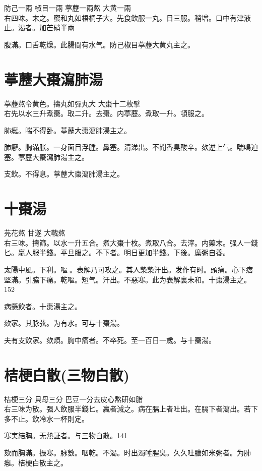 防己{\scriptsize 一兩} 椒目{\scriptsize 一兩} 葶藶{\scriptsize 一兩熬} 大黄{\scriptsize 一兩}\\
右四味。末之。蜜和丸如梧桐子大。先食飲服一丸。日三服。稍增。口中有津液止。渴者。加芒硝半兩

腹滿。口舌乾燥。此腸間有水气。防己椒目葶藶大黄丸主之。

\section{葶藶大棗瀉肺湯}

葶藶{\scriptsize 熬令黄色。擣丸如彈丸大} 大棗{\scriptsize 十二枚擘}\\
右先以水三升煮棗。取二升。去棗。内葶藶。煮取一升。頓服之。

肺癰。喘不得卧。葶藶大棗瀉肺湯主之。

肺癰。胸滿胀。一身面目浮腫。鼻塞。清涕出。不聞香臭酸辛。欬逆上气。喘鳴迫塞。葶藶大棗瀉肺湯主之。

支飲。不得息。葶藶大棗瀉肺湯主之。

\section{十棗湯}

芫花{\scriptsize 熬} 甘遂{ }大戟{\scriptsize 熬}\\
右三味。擣篩。以水一升五合。煮大棗十枚。煮取八合。去滓。内藥末。强人一錢匕。羸人服半錢。平旦服之。不下者。明日更加半錢。下後。糜粥自養。

太陽中風。下利。嘔{\sungii 𠱘}。表解乃可攻之。其人漐漐汗出。发作有时。頭痛。心下痞堅滿。引脇下痛。乾嘔。短气。汗出。不惡寒。此为表解裏未和。十棗湯主之。152

病懸飲者。十棗湯主之。

欬家。其脉弦。为有水。可与十棗湯。

夫有支飲家。欬煩。胸中痛者。不卒死。至一百日一歲。与十棗湯。

\section{桔梗白散(三物白散)}

桔梗{\scriptsize 三分} 貝母{\scriptsize 三分} 巴豆{\scriptsize 一分去皮心熬研如脂}\\
右三味为散。强人飲服半錢匕。羸者減之。病在膈上者吐出。在膈下者瀉出。若下多不止。飲冷水一杯則定。

寒実結胸。无熱証者。与三物白散。141

欬而胸滿。振寒。脉數。咽乾。不渴。时出濁唾腥臭。久久吐膿如米粥者。为肺癰。桔梗白散主之。

